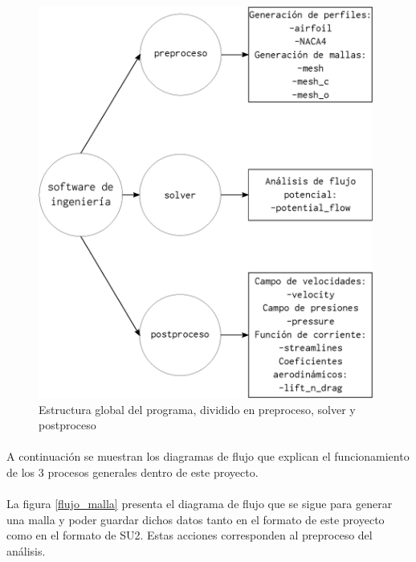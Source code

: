 \documentclass[letterpaper, openright, 12pt]{book}
\begin{document}
    \begin{figure}[htbp!]
        \centering
        \includegraphics[keepaspectratio, width=110mm]{./Imagenes/estructura_global}
        \caption[Estructura global del programa]{Estructura global del programa,
        dividido en preproceso, solver y postproceso}
        \label{estructura_global}
    \end{figure}

    \paragraph*{}
        A continuación se muestran los diagramas de flujo que explican el
        funcionamiento de los 3 procesos generales dentro de este proyecto.

    \paragraph*{}
        La figura \ref{flujo_malla} presenta el diagrama de flujo que se sigue
        para generar una malla y poder guardar dichos datos tanto en el formato
        de este proyecto como en el formato de SU2. Estas acciones corresponden
        al preproceso del análisis.
\end{document}
